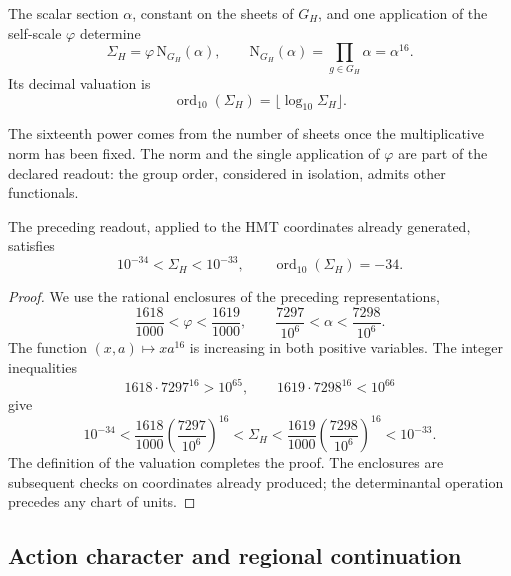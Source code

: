 \begin{definition}
\label{iv:action:norma}
The scalar section \(\alpha\), constant on the sheets of \(G_H\),
and one application of the self-scale \(\varphi\) determine
\begin{equation}
 \Sigma_H=\varphi\,\mathrm N_{G_H}(\alpha),\qquad
 \mathrm N_{G_H}(\alpha)=\prod_{g\in G_H}\alpha=\alpha^{16}.
 \label{iv:action:sigma}
\end{equation}
Its decimal valuation is
\[
 \operatorname{ord}_{10}(\Sigma_H)
   =\lfloor\log_{10}\Sigma_H\rfloor.
\]
\end{definition}
The sixteenth power comes from the number of sheets once the
multiplicative norm has been fixed. The norm and the single application of
\(\varphi\) are part of the declared readout: the group order,
considered in isolation, admits other functionals.

\begin{theorem}
\label{iv:action:decada}
The preceding readout, applied to the HMT coordinates already generated,
satisfies
\begin{equation}
 10^{-34}<\Sigma_H<10^{-33},
 \qquad \operatorname{ord}_{10}(\Sigma_H)=-34.
 \label{iv:action:orden-decimal}
\end{equation}
\end{theorem}
\begin{proof}
We use the rational enclosures of the preceding
representations,
\begin{equation}
 \frac{1618}{1000}<\varphi<\frac{1619}{1000},
 \qquad
 \frac{7297}{10^6}<\alpha<\frac{7298}{10^6}.
 \label{iv:action:intervalos}
\end{equation}
The function \((x,a)\mapsto xa^{16}\) is increasing in both
positive variables. The integer inequalities
\[
 1618\cdot7297^{16}>10^{65},
 \qquad 1619\cdot7298^{16}<10^{66}
\]
give
\[
 10^{-34}
 <\frac{1618}{1000}\left(\frac{7297}{10^6}\right)^{16}
 <\Sigma_H
 <\frac{1619}{1000}\left(\frac{7298}{10^6}\right)^{16}
 <10^{-33}.
\]
The definition of the valuation completes the proof. The enclosures
are subsequent checks on coordinates already produced; the
determinantal operation precedes any chart of units.
\end{proof}

\subsection{Action character and regional continuation}
\label{iv:action:caracter}

